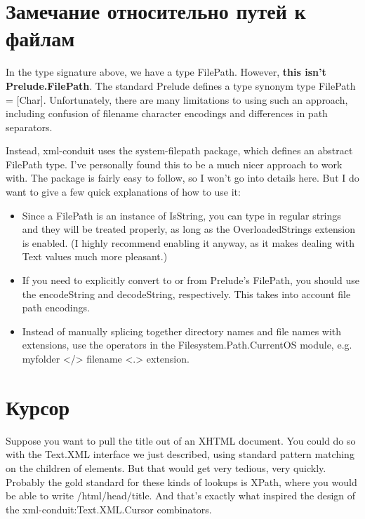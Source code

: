\section{Замечание относительно путей к файлам} %

In the type signature above, we have a type FilePath. However, {\bf this isn't Prelude.FilePath}. The standard Prelude defines a type synonym type FilePath = [Char]. Unfortunately, there are many limitations to using such an approach, including confusion of filename character encodings and differences in path separators.

Instead, xml-conduit uses the system-filepath package, which defines an abstract FilePath type. I've personally found this to be a much nicer approach to work with. The package is fairly easy to follow, so I won't go into details here. But I do want to give a few quick explanations of how to use it:

\begin{itemize}
\item Since a FilePath is an instance of IsString, you can type in regular strings and they will be treated properly, as long as the OverloadedStrings extension is enabled. (I highly recommend enabling it anyway, as it makes dealing with Text values much more pleasant.)
\item If you need to explicitly convert to or from Prelude's FilePath, you should use the encodeString and decodeString, respectively. This takes into account file path encodings.
\item Instead of manually splicing together directory names and file names with extensions, use the operators in the Filesystem.Path.CurrentOS module, e.g. myfolder </> filename <.> extension.
\end{itemize}
  
\section{Курсор} %

Suppose you want to pull the title out of an XHTML document. You could do so with the Text.XML interface we just described, using standard pattern matching on the children of elements. But that would get very tedious, very quickly. Probably the gold standard for these kinds of lookups is XPath, where you would be able to write /html/head/title. And that's exactly what inspired the design of the xml-conduit:Text.XML.Cursor combinators.

